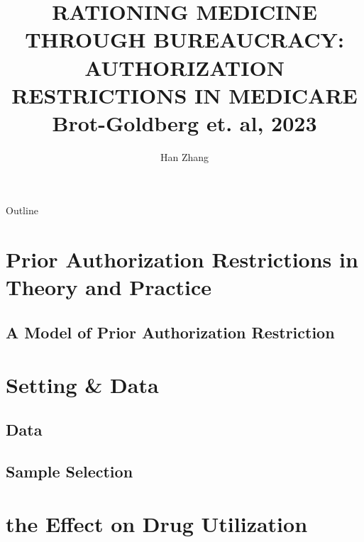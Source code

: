 \documentclass[hyperref={colorlinks,citecolor=blue,linkcolor=blue,urlcolor=blue}]{beamer}
\title[]{RATIONING MEDICINE THROUGH BUREAUCRACY: AUTHORIZATION RESTRICTIONS IN MEDICARE \\ 
Brot-Goldberg et. al, 2023}
\author{Han Zhang}
\institute{UT Austin}
\date{}
\begin{document}
\begin{frame}
  \titlepage
\end{frame}





\begin{frame}{Outline}
  \tableofcontents

\end{frame}

\section{Prior Authorization Restrictions in Theory and Practice}


\subsection{A Model of Prior Authorization Restriction}




\section{Setting \& Data}

\subsection{Data}


\subsection{Sample Selection}




\section{the Effect on Drug Utilization}






\end{document}
